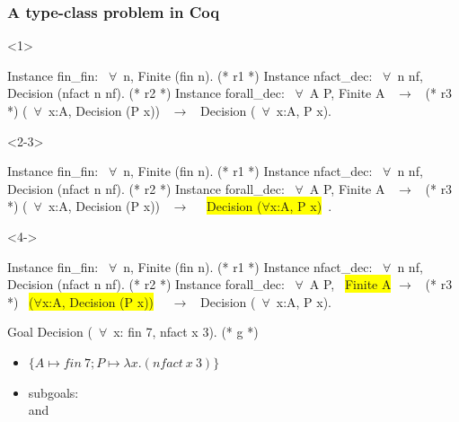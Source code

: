 \documentclass{pres}
\begin{document}
\begin{frame}[fragile]
  \frametitle{A type-class problem in Coq}

  \begin{onlyenv}<1>
    \begin{coqcode}
      Instance fin_fin: ~$\forall$~n, Finite (fin n).             (* r1 *)
      Instance nfact_dec: ~$\forall$~n nf, Decision (nfact n nf). (* r2 *)
      Instance forall_dec: ~$\forall$~A P, Finite A ~$\to$~            (* r3 *)
        (~$\forall$~x:A, Decision (P x)) ~$\to$~ Decision (~$\forall$~x:A, P x).
    \end{coqcode}
  \end{onlyenv}

  \begin{onlyenv}<2-3>
    \begin{coqcode}
      Instance fin_fin: ~$\forall$~n, Finite (fin n).             (* r1 *)
      Instance nfact_dec: ~$\forall$~n nf, Decision (nfact n nf). (* r2 *)
      Instance forall_dec: ~$\forall$~A P, Finite A ~$\to$~            (* r3 *)
        (~$\forall$~x:A, Decision (P x)) ~$\to$~ ~\colorbox{yellow}{Decision ($\forall$x:A, P x)}~.
    \end{coqcode}
  \end{onlyenv}

  \begin{onlyenv}<4->
    \begin{coqcode}
      Instance fin_fin: ~$\forall$~n, Finite (fin n).             (* r1 *)
      Instance nfact_dec: ~$\forall$~n nf, Decision (nfact n nf). (* r2 *)
      Instance forall_dec: ~$\forall$~A P, ~\colorbox{yellow}{Finite A} $\to$~           (* r3 *)
        ~\colorbox{yellow}{($\forall$x:A, Decision (P x))}~ ~$\to$~ Decision (~$\forall$~x:A, P x).
    \end{coqcode}
  \end{onlyenv}

  \mysep{}

  \begin{coqcode}
    Goal Decision (~$\forall$~x: fin 7, nfact x 3).             (* g *)
  \end{coqcode}

  \begin{itemize}
    \item<2-> $\{A \mapsto fin\ 7; P \mapsto \lambda x.(nfact\ x\ 3)\}$
    \item<4> subgoals:\\
       and 
  \end{itemize}


\end{frame}
\end{document}
